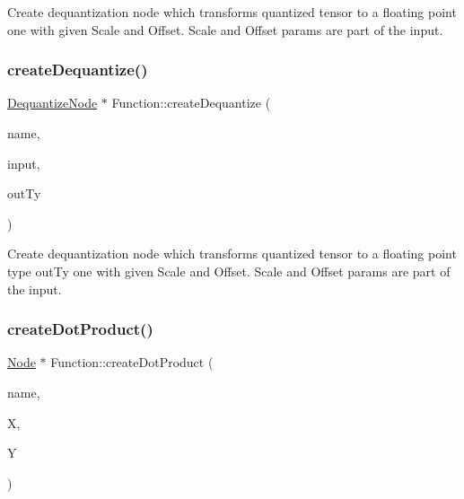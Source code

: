 Create dequantization node which transforms quantized tensor to a floating point one with given Scale and Offset. Scale and Offset params are part of the {\ttfamily input}. \mbox{\label{classglow_1_1_function_a5f8e4f0404804fe1b57bb77e5f9a48e8}} 
\subsubsection{\texorpdfstring{create\+Dequantize()}{createDequantize()}\hspace{0.1cm}{\footnotesize\ttfamily [2/2]}}
{\footnotesize\ttfamily \hyperlink{classglow_1_1_dequantize_node}{Dequantize\+Node} $\ast$ Function\+::create\+Dequantize (\begin{DoxyParamCaption}\item[{llvm\+::\+String\+Ref}]{name,  }\item[{\hyperlink{structglow_1_1_node_value}{Node\+Value}}]{input,  }\item[{\hyperlink{structglow_1_1_type}{Type\+Ref}}]{out\+Ty }\end{DoxyParamCaption})}

Create dequantization node which transforms quantized tensor to a floating point type {\ttfamily out\+Ty} one with given Scale and Offset. Scale and Offset params are part of the {\ttfamily input}. \mbox{\label{classglow_1_1_function_accf9b83116497dd0ac4c3bb730be5153}} 
\subsubsection{\texorpdfstring{create\+Dot\+Product()}{createDotProduct()}}
{\footnotesize\ttfamily \hyperlink{classglow_1_1_node}{Node} $\ast$ Function\+::create\+Dot\+Product (\begin{DoxyParamCaption}\item[{llvm\+::\+String\+Ref}]{name,  }\item[{\hyperlink{structglow_1_1_node_value}{Node\+Value}}]{X,  }\item[{\hyperlink{structglow_1_1_node_value}{Node\+Value}}]{Y }\end{DoxyParamCaption})}

